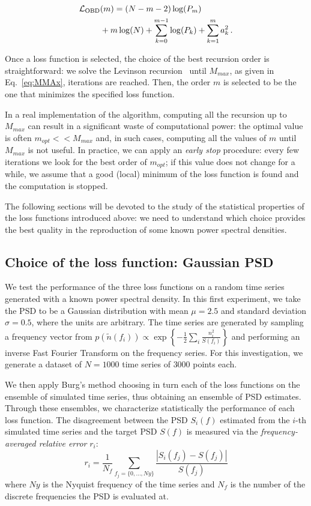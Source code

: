 \documentclass[twocolumn,showpacs,preprintnumbers,nofootinbib,prd,
superscriptaddress,10pt]{revtex4-1}
\begin{document}
\begin{itemize}
   \begin{align}
        \mathcal{L}_{\rm OBD}&(m) = (N - m - 2) \log(P_m) \nonumber\\
        &+ m \log(N) + \sum_{k = 0}^{m-1} \log(P_k) + \sum_{k = 1}^{m} a_k^2\,.
    \end{align}
\end{itemize}

Once a loss function is selected, the choice of the best recursion order is straightforward: we solve the Levinson recursion~\cite{doi:10.1002/sapm1946251261} until $M_{max}$, as given in Eq.~\eqref{eq:MMAx}, iterations are reached. Then, the order $m$ is selected to be the one that minimizes the specified loss function.

In a real implementation of the algorithm, computing all the recursion up to $M_{max}$ can result in a significant waste of computational power: the optimal value is often $m_{opt} << M_{max}$ and, in such cases, computing all the values of $m$ until $M_{max}$ is not useful.
In practice, we can apply an \textit{early stop} procedure: every few iterations we look for the best order of $m_{opt}$; if this value does not change for a while, we assume that a good (local) minimum of the loss function is found and the computation is stopped.

The following sections will be devoted to the study of the statistical properties of the loss functions introduced above: we need to understand which choice provides the best quality in the reproduction of some known power spectral densities. 

\subsection{Choice of the loss function: Gaussian PSD} \label{sec:arp_validation}
We test the performance of the three loss functions on a random time series generated with a known power spectral density.
In this first experiment, we take the PSD to be a Gaussian distribution with mean $\mu = 2.5$ and standard deviation $\sigma = 0.5$, where the units are arbitrary.
The time series are generated by sampling a frequency vector from ${p(\tilde{n}(f_i)) \propto \exp{\left\{-\frac{1}{2}\sum_i\frac{n_i ^2}{S(f_i)}\right\}}}$ and performing an inverse Fast Fourier Transform on the frequency series. 
For this investigation, we generate a dataset of $N=1000$ time series of $3000$ points each.

We then apply Burg's method choosing in turn each of the loss functions on the ensemble of simulated time series, 
thus obtaining an ensemble of PSD estimates. Through these ensembles, we characterize statistically the performance of each loss function.
The disagreement between the PSD $S_i(f)$ estimated from the $i$-th simulated time series and the target PSD $S(f)$ is measured via 
the \textit{frequency-averaged relative error} $r_i$:
\begin{equation}\label{eq:freq_error}
	r_i = \frac{1}{N_f}\sum_{f_j=\{0, \hdots , Ny\}} \frac{|S_i(f_j) - S(f_j)|}{S(f_j)}
\end{equation}
where $Ny$ is the Nyquist frequency of the time series and $N_f$ is the number of the discrete frequencies the PSD is evaluated at.
\end{document}
